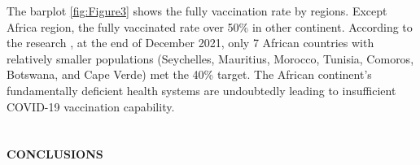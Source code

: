 \documentclass[11pt,a4paper,]{article}
\begin{document}
The barplot \ref{fig:Figure3} shows the fully vaccination rate by regions. Except Africa region, the fully vaccinated rate over 50\% in other continent. According to the research \textcite{African-COVID-19-vaccination}, at the end of December 2021, only 7 African countries with relatively smaller populations (Seychelles, Mauritius, Morocco, Tunisia, Comoros, Botswana, and Cape Verde) met the 40\% target. The African continent's fundamentally deficient health systems are undoubtedly leading to insufficient COVID-19 vaccination capability.

\clearpage

\section*{}

\clearpage

\clearpage

\section*{}

\section*{}

\textbf{CONCLUSIONS}

\printbibliography
\end{document}
